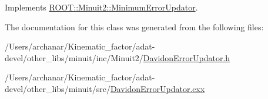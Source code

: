 Implements \mbox{\hyperlink{classROOT_1_1Minuit2_1_1MinimumErrorUpdator_ae75c33152c49ebf34e6119adc0bbbda9}{R\+O\+O\+T\+::\+Minuit2\+::\+Minimum\+Error\+Updator}}.



The documentation for this class was generated from the following files\+:\begin{DoxyCompactItemize}
\item 
/\+Users/archanar/\+Kinematic\+\_\+factor/adat-\/devel/other\+\_\+libs/minuit/inc/\+Minuit2/\mbox{\hyperlink{adat-devel_2other__libs_2minuit_2inc_2Minuit2_2DavidonErrorUpdator_8h}{Davidon\+Error\+Updator.\+h}}\item 
/\+Users/archanar/\+Kinematic\+\_\+factor/adat-\/devel/other\+\_\+libs/minuit/src/\mbox{\hyperlink{adat-devel_2other__libs_2minuit_2src_2DavidonErrorUpdator_8cxx}{Davidon\+Error\+Updator.\+cxx}}\end{DoxyCompactItemize}
